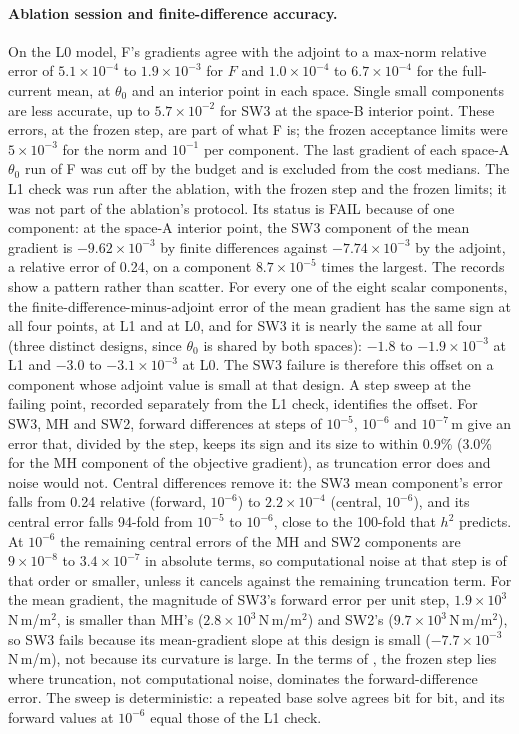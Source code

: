 \documentclass{anvil-paper}
\begin{document}
\paragraph{Ablation session and finite-difference accuracy.}
On the L0 model, F's gradients agree with the adjoint to a max-norm
relative error of $5.1\times10^{-4}$ to $1.9\times10^{-3}$ for $F$ and
$1.0\times10^{-4}$ to $6.7\times10^{-4}$ for the full-current mean, at
$\theta_0$ and an interior point in each space. Single small components are
less accurate, up to $5.7\times10^{-2}$ for SW3 at the space-B interior
point. These errors, at the frozen step, are part of what F is; the frozen
acceptance limits were $5\times10^{-3}$ for the norm and $10^{-1}$ per
component. The last gradient of each space-A $\theta_0$ run of F was cut
off by the budget and is excluded from the cost medians. The L1 check was
run after the ablation, with the frozen step
and the frozen limits; it was not part of the ablation's protocol. Its
status is FAIL because of one component: at the space-A interior point, the
SW3 component of the mean gradient is $-9.62\times10^{-3}$ by finite
differences against $-7.74\times10^{-3}$ by the adjoint, a relative error
of 0.24, on a component $8.7\times10^{-5}$ times the largest. The records
show a pattern rather than scatter. For every one of the eight scalar
components, the finite-difference-minus-adjoint error of the mean gradient
has the same sign at all four points, at L1 and at L0, and for SW3 it is
nearly the same at all four (three distinct designs, since $\theta_0$ is
shared by both spaces): $-1.8$ to $-1.9\times10^{-3}$ at L1 and $-3.0$ to
$-3.1\times10^{-3}$ at L0. The SW3 failure is therefore this offset on a component whose adjoint
value is small at that design. A step sweep at the failing point,
recorded separately from the L1 check, identifies the offset. For SW3, MH
and SW2, forward differences at steps of $10^{-5}$, $10^{-6}$ and
$10^{-7}$\,m give an error that, divided by the step, keeps its sign and
its size to within 0.9\% (3.0\% for the MH component of the objective
gradient), as truncation error does and noise would not. Central
differences remove it: the SW3 mean component's error falls from 0.24
relative (forward, $10^{-6}$) to $2.2\times10^{-4}$ (central, $10^{-6}$),
and its central error falls 94-fold from $10^{-5}$ to $10^{-6}$, close to
the 100-fold that $h^2$ predicts. At $10^{-6}$ the remaining central errors
of the MH and SW2 components are $9\times10^{-8}$ to $3.4\times10^{-7}$ in
absolute terms, so computational noise at that step is of that order or
smaller, unless it cancels against the remaining truncation term. For the
mean gradient, the magnitude of SW3's forward error per unit step,
$1.9\times10^{3}$\,N\,m/m$^2$, is smaller than MH's
($2.8\times10^{3}$\,N\,m/m$^2$) and SW2's ($9.7\times10^{3}$\,N\,m/m$^2$), so SW3 fails because its mean-gradient
slope at this design is small ($-7.7\times10^{-3}$\,N\,m/m), not because
its curvature is large. In the terms of \citet{more2011estimating,more2012estimating},
the frozen step lies where truncation, not computational noise, dominates
the forward-difference error. The sweep is deterministic: a repeated base
solve agrees bit for bit, and its forward values at $10^{-6}$ equal those of
the L1 check.
\end{document}
